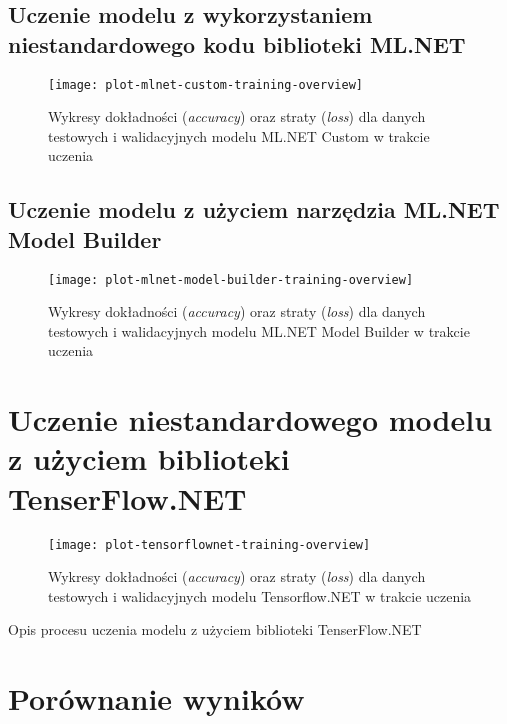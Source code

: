 \subsection{Uczenie modelu z wykorzystaniem niestandardowego kodu biblioteki ML.NET}

\begin{figure}[ht]
  \texttt{[image: plot-mlnet-custom-training-overview]}
  \caption[Wykresy statystyk modelu ML.NET Custom w trakcie uczenia]{Wykresy dokładności (\emph{accuracy}) oraz straty (\emph{loss}) dla danych testowych i walidacyjnych modelu ML.NET Custom w trakcie uczenia}
  \label{fig:plot-mlnet-custom-training-overview}
\end{figure}

\subsection{Uczenie modelu z użyciem narzędzia ML.NET Model Builder}

\begin{figure}[ht]
  \texttt{[image: plot-mlnet-model-builder-training-overview]}
  \caption[Wykresy statystyk modelu ML.NET Model Builder w trakcie uczenia]{Wykresy dokładności (\emph{accuracy}) oraz straty (\emph{loss}) dla danych testowych i walidacyjnych modelu ML.NET Model Builder w trakcie uczenia}
  \label{fig:plot-mlnet-model-builder-training-overview}
\end{figure}

\section{Uczenie niestandardowego modelu z użyciem biblioteki TenserFlow.NET}

\begin{figure}[ht]
  \texttt{[image: plot-tensorflownet-training-overview]}
  \caption[Wykresy statystyk modelu Tensorflow.NET w trakcie uczenia]{Wykresy dokładności (\emph{accuracy}) oraz straty (\emph{loss}) dla danych testowych i walidacyjnych modelu Tensorflow.NET w trakcie uczenia}
  \label{fig:plot-tensorflownet-training-overview}
\end{figure}

Opis procesu uczenia modelu z użyciem biblioteki TenserFlow.NET

\section{Porównanie wyników}

